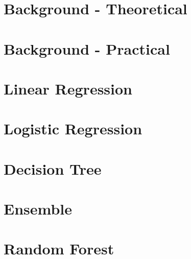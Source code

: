\section[Theory]{Background - Theoretical}



\section[Practical]{Background - Practical}



% 


\section[LinRegr]{Linear Regression}




\section[LogiRegr]{Logistic Regression}





\section[Tree]{Decision Tree}








\section[Ensemble]{Ensemble}



\section[RandomForest]{Random Forest}





